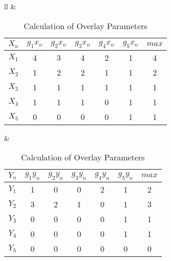 \begin{table}[!h]
	\centering
	\caption{Calculation of Overlay Parameters}
	\label{calcoverlay}
	\scriptsize
	\begin{tabular}{ll}
		  & \\ %
	\begin{tabular}{ccccccc}
		\toprule
		$X_{n}$		& $g_{1}x_{n}$		& $g_{2}x_{n}$		& $g_{3}x_{n}$		& $g_{4}x_{n}$	& $g_{5}x_{n}$ 		& $max$ 	\\
		\midrule	                                                                    	            	                                    	
		$X_{1}$		&  4  				& 3					& 4					& 2		& 1					& 4			\\
		$X_{2}$		&  1  				& 2					& 2					& 1		& 1					& 2			\\
		$X_{3}$		&  1   				& 1					& 1					& 1		& 1					& 1			\\
		$X_{4}$		&  1   				& 1					& 1 				& 0		& 1					& 1			\\
		$X_{5}$		&  0   				& 0					& 0 				& 0		& 1					& 1			\\		
		\bottomrule	                                                                       
		
	\end{tabular}
		&
	\begin{tabular}{ccccccc}
		\toprule
		$Y_{n}$		& $g_{1}y_{n}$		& $g_{2}y_{n}$		& $g_{3}y_{n}$		& $g_{4}y_{n}$		& $g_{5}y_{n}$ 		& $max$ 	\\
		\midrule	                                                                    	            	                                    	
		$Y_{1}$		& 1     			& 0					& 0					& 2		& 1					& 2			\\
		$Y_{2}$		& 3    				& 2					& 1					& 0		& 1					& 3			\\
		$Y_{3}$		& 0     			& 0					& 0					& 0		& 1					& 1			\\
		$Y_{4}$		& 0    				& 0					& 0 				& 0		& 1					& 1			\\
		$Y_{5}$		& 0    				& 0					& 0 				& 0		& 0					& 0			\\		
		\bottomrule	                                                                       
		
	\end{tabular}
	\end{tabular}
	
	
	
	
\end{table}

